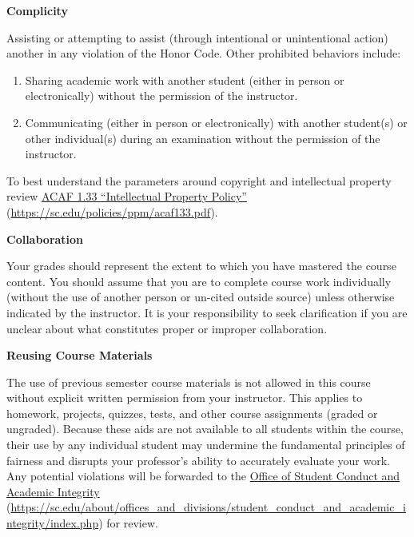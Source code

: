 \documentclass[11pt,letterpaper]{article}
\begin{document}
{\bfseries Complicity} \par
Assisting or attempting to assist (through intentional or unintentional action) another in any violation of the Honor Code. Other prohibited behaviors include:
	\begin{enumerate}[1.]
	\item Sharing academic work with another student (either in person or electronically) without the permission of the instructor.
	\item Communicating (either in person or electronically) with another student(s) or other individual(s) during an examination without the permission of the instructor.
	\end{enumerate}
To best understand the parameters around copyright and intellectual property review \href{https://sc.edu/policies/ppm/acaf133.pdf}{ACAF 1.33 ``Intellectual Property Policy''} (\url{https://sc.edu/policies/ppm/acaf133.pdf}). \pspace

{\bfseries Collaboration} \par
Your grades should represent the extent to which you have mastered the course content. You should assume that you are to complete course work individually (without the use of another person or un-cited outside source) unless otherwise indicated by the instructor. It is your responsibility to seek clarification if you are unclear about what constitutes proper or improper collaboration. \pspace

{\bfseries Reusing Course Materials} \par
The use of previous semester course materials is not allowed in this course without explicit written permission from your instructor. This applies to homework, projects, quizzes, tests, and other course assignments (graded or ungraded). Because these aids are not available to all students within the course, their use by any individual student may undermine the fundamental principles of fairness and disrupts your professor's ability to accurately evaluate your work. Any potential violations will be forwarded to the \href{https://sc.edu/about/offices\_and\_divisions/student\_conduct\_and\_academic\_integrity/index.php}{Office of Student Conduct and Academic Integrity} (\url{https://sc.edu/about/offices\_and\_divisions/student\_conduct\_and\_academic\_integrity/index.php}) for review. \sectionbreak



 \pvspace{0.1cm}
\end{document}
